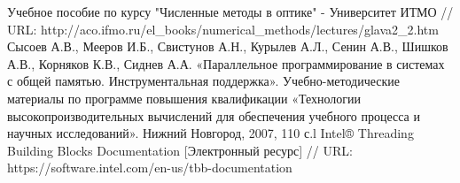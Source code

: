 \documentclass{report}
\begin{document}
\begin{thebibliography}{1}
 Учебное пособие по курсу "Численные методы в оптике" - Университет ИТМО // URL: http://aco.ifmo.ru/el\_books/numerical\_methods/lectures/glava2\_2.htm
 Сысоев А.В., Мееров И.Б., Свистунов А.Н., Курылев А.Л., Сенин А.В., Шишков А.В., Корняков К.В., Сиднев А.А. «Параллельное программирование в системах с общей памятью. Инструментальная поддержка». Учебно-методические материалы по программе повышения квалификации «Технологии высокопроизводительных вычислений для обеспечения учебного процесса и научных исследований». Нижний Новгород, 2007, 110 с.l
 Intel® Threading Building Blocks Documentation [Электронный ресурс] // URL: https://software.intel.com/en-us/tbb-documentation
\end{thebibliography}
\newpage
\end{document}
